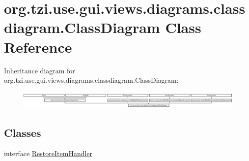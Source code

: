 \hypertarget{classorg_1_1tzi_1_1use_1_1gui_1_1views_1_1diagrams_1_1classdiagram_1_1_class_diagram}{\section{org.\-tzi.\-use.\-gui.\-views.\-diagrams.\-classdiagram.\-Class\-Diagram Class Reference}
\label{classorg_1_1tzi_1_1use_1_1gui_1_1views_1_1diagrams_1_1classdiagram_1_1_class_diagram}
}
Inheritance diagram for org.\-tzi.\-use.\-gui.\-views.\-diagrams.\-classdiagram.\-Class\-Diagram\-:\begin{figure}[H]
\begin{center}
\leavevmode
\includegraphics[height=0.903226cm]{classorg_1_1tzi_1_1use_1_1gui_1_1views_1_1diagrams_1_1classdiagram_1_1_class_diagram}
\end{center}
\end{figure}
\subsection*{Classes}
\begin{DoxyCompactItemize}
\item 
interface \hyperlink{interfaceorg_1_1tzi_1_1use_1_1gui_1_1views_1_1diagrams_1_1classdiagram_1_1_class_diagram_1_1_restore_item_handler}{Restore\-Item\-Handler}
\end{DoxyCompactItemize}
